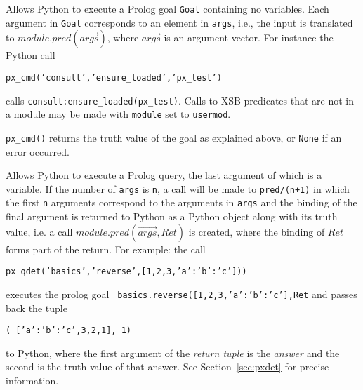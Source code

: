 \begin{description}

%
  Allows Python to execute a Prolog goal {\tt Goal} containing no
  variables.  Each argument in {\tt Goal} corresponds to an element
  in {\tt args}, i.e., the input is translated to
  $module.pred(\vec{args})$, where $\vec{args}$ is an argument vector.
  For instance the Python call

  {\tt px\_cmd('consult','ensure\_loaded','px\_test')}

  calls {\tt consult:ensure\_loaded(px\_test)}.  Calls to XSB
  predicates that are not in a module may be made with {\tt module}
  set to {\tt usermod}.

  {\tt px\_cmd()} returns the truth value of the goal as explained
  above, or {\tt None} if an error occurred.
  
%
  Allows Python to execute a Prolog query, the last argument of which
  is a variable.  If the number of {\tt args} is {\tt n}, a call will
  be made to {\tt pred/(n+1)} in which the first {\tt n} arguments
  correspond to the arguments in {\tt args} and the binding of the 
  final argument is returned to Python as a Python object along with
  its truth value, i.e. a call $module.pred(\vec{args},Ret)$ is
  created, where the binding of $Ret$ forms part of the return.  For
  example: the call

  {\tt px\_qdet('basics','reverse',[1,2,3,{'a':{'b':'c'}}]))}

  \noindent
  executes the prolog goal {\tt
    basics.reverse([1,2,3,{'a':{'b':'c'}}],Ret} and passes back the tuple

  {\tt ( [{'a':{'b':'c'}},3,2,1], 1)}

  \noindent
  to Python, where the first argument of the {\em return tuple} is the
  {\em answer} and the second is the truth value of that answer.  See
  Section~\ref{sec:pxdet} for precise information.


\end{description}
